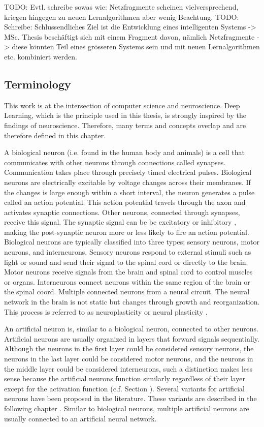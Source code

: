 TODO: Evtl. schreibe sowas wie: Netzfragmente scheinen vielversprechend, kriegen hingegen zu neuen Lernalgorithmen aber wenig Beachtung. 
TODO: Schreibe: Schlussendliches Ziel ist die Entwicklung eines intelligenten Systems -> MSc. Thesis beschäftigt sich mit einem Fragment davon, nämlich Netzfragmente -> diese könnten Teil eines grösseren Systems sein und mit neuen Lernalgorithmen etc. kombiniert werden.

\subsection{Terminology}
This work is at the intersection of computer science and neuroscience.
Deep Learning, which is the principle used in this thesis, is strongly inspired by the findings of neuroscience.
Therefore, many terms and concepts overlap and are therefore defined in this chapter.

A biological neuron (i.e. found in the human body and animals) is a cell that communicates with other neurons through connections called synapses.
Communication takes place through precisely timed electrical pulses.
Biological neurons are electrically excitable by voltage changes across their membranes.
If the changes is large enough within a short interval, the neuron generates a pulse called an action potential.
This action potential travels through the axon and activates synaptic connections.
Other neurons, connected through synapses, receive this signal.
The synaptic signal can be be excitatory  or inhibitory , making the post-synaptic neuron more or less likely to fire an action potential.
Biological neurons are typically classified into three types; sensory neurons, motor neurons, and interneurons.
Sensory neurons respond to external stimuli such as light or sound and send their signal to the spinal cord or directly to the brain.
Motor neurons receive signals from the brain and spinal cord to control muscles or organs.
Interneurons connect neurons within the same region of the brain or the spinal coord.
Multiple connected neurons from a neural circuit.
The neural network in the brain is not static but changes through growth and reorganization.
This process is referred to as neuroplasticity or neural plasticity .

An artificial neuron is, similar to a biological neuron, connected to other neurons.
Artificial neurons are usually organized in layers that forward signals sequentially.
Although the neurons in the first layer could be considered sensory neurons, the neurons in the last layer could be considered motor neurons, and the neurons in the middle layer could be considered interneurons, such a distinction makes less sense because the artificial neurons function similarly regardless of their layer except for the activation function (c.f. Section ).
Several variants for artificial neurons have been proposed in the literature. These variants are described in the following chapter .
Similar to biological neurons, multiple artificial neurons are usually connected to an artificial neural network.

